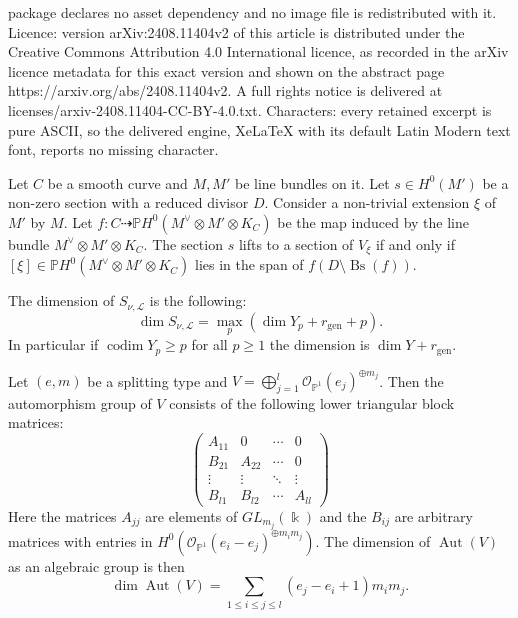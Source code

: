 \documentclass[10pt,a4paper]{amsart}
\newcommand{\OO}{\mathcal{O}}
\newcommand{\PP}{\mathbb{P}}
\newcommand{\cL}{\mathcal{L}}
\newcommand{\op}{\operatorname}
\begin{document}
package declares no asset dependency and no image file is redistributed with it. Licence: version arXiv:2408.11404v2 of this article is distributed under the Creative Commons Attribution 4.0 International licence, as recorded in the arXiv licence metadata for this exact version and shown on the abstract page https://arxiv.org/abs/2408.11404v2. A full rights notice is delivered at licenses/arxiv-2408.11404-CC-BY-4.0.txt. Characters: every retained excerpt is pure ASCII, so the delivered engine, XeLaTeX with its default Latin Modern text font, reports no missing character.
\begin{lemma}\label{lemma:lift_section}
Let $C$ be a smooth curve and $M, M' $ be line bundles on it. Let $s \in H^0(M')$ be a non-zero section with a reduced divisor $D$. Consider a non-trivial extension $\xi$ of $M'$ by $M$. Let $f: C \dashrightarrow \PP H^0(M^\vee \otimes M'\otimes K_C)$ be the map induced by the line bundle $M^\vee \otimes M'\otimes K_C$. The section $s$ lifts to a section of $V_\xi$ if and only if $[\xi] \in \PP H^0(M^\vee\otimes M' \otimes K_C)$ lies in the span of $f(D\setminus \op{Bs}(f))$. 
\end{lemma}

\begin{lemma}\label{lemma:dimension_section_space}
The dimension of $S_{\nu,\cL}$ is the following:
\begin{equation*}
\dim S_{\nu,\cL} = \op{max}_p \left(\dim Y_p + r_{\op{gen}}+p\right).
\end{equation*}
In particular if $\op{codim} Y_p \geq p $ for all $p \geq 1$ the dimension is $\dim Y + r_{\op{gen}}$. 
\end{lemma}

\begin{lemma}\label{lemma:aut_vectorbundle}
Let $(e,m)$ be a splitting type and $V=\bigoplus_{j=1}^l \OO_{\PP^1}(e_j)^{\oplus m_j}$. Then the automorphism group of $V$ consists of the following lower triangular block matrices:
\begin{equation*}
\begin{pmatrix}
A_{11} & 0 & \cdots & 0 \\
B_{21} & A_{22} & \cdots & 0 \\
\vdots & \vdots & \ddots &\vdots \\
B_{l1} & B_{l2} &\cdots& A_{ll}
\end{pmatrix}
\end{equation*}
Here the matrices $A_{jj}$ are elements of $GL_{m_j}(\Bbbk)$ and the $B_{ij}$ are arbitrary matrices with entries in $H^0(\OO_{\PP^1}(e_i - e_j)^{\oplus m_im_j})$. The dimension of $\op{Aut}(V)$ as an algebraic group is then
\begin{equation*}
\dim\op{Aut}(V) = \sum_{1\leq i \leq j \leq l}(e_j - e_i+1)m_im_j.
\end{equation*}
\end{lemma}
\end{document}
